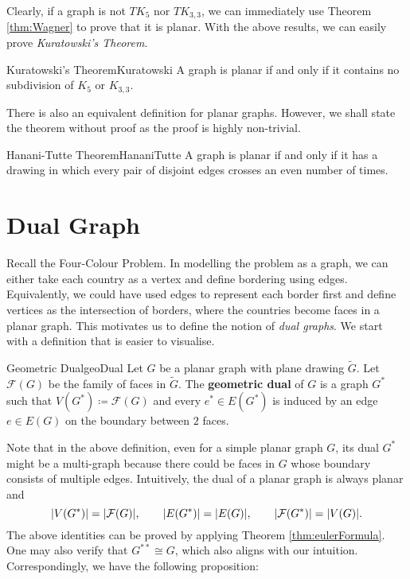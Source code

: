 \documentclass[math, code]{amznotes}
\theoremstyle{remark}
\begin{document}
Clearly, if a graph is not $TK_5$ nor $TK_{3, 3}$, we can immediately use Theorem \ref{thm:Wagner} to prove that it is planar. With the above results, we can easily prove \textit{Kuratowski's Theorem}.
\begin{thmbox}{Kuratowski's Theorem}{Kuratowski}
    A graph is planar if and only if it contains no subdivision of $K_5$ or $K_{3, 3}$.
\end{thmbox}
There is also an equivalent definition for planar graphs. However, we shall state the theorem without proof as the proof is highly non-trivial.
\begin{thmbox}{Hanani-Tutte Theorem}{HananiTutte}
    A graph is planar if and only if it has a drawing in which every pair of disjoint edges crosses an even number of times.
\end{thmbox}
\section{Dual Graph}
Recall the Four-Colour Problem. In modelling the problem as a graph, we can either take each country as a vertex and define bordering using edges. Equivalently, we could have used edges to represent each border first and define vertices as the intersection of borders, where the countries become faces in a planar graph. This motivates us to define the notion of \textit{dual graphs}. We start with a definition that is easier to visualise.
\begin{dfnbox}{Geometric Dual}{geoDual}
    Let $G$ be a planar graph with plane drawing $\tilde{G}$. Let $\mathcal{F}(G)$ be the family of faces in $\tilde{G}$. The {\color{red} \textbf{geometric dual}} of $G$ is a graph $G^*$ such that $V(G^*) \coloneqq \mathcal{F}(G)$ and every $e^* \in E(G^*)$ is induced by an edge $e \in E(G)$ on the boundary between $2$ faces.
\end{dfnbox}
Note that in the above definition, even for a simple planar graph $G$, its dual $G^*$ might be a multi-graph because there could be faces in $G$ whose boundary consists of multiple edges. Intuitively, the dual of a planar graph is always planar and 
\begin{equation*}
    {\left\lvert {V(G^*)} \right\rvert} = {\left\lvert {\mathcal{F}(G)} \right\rvert}, \qquad {\left\lvert {E(G^*)} \right\rvert} = {\left\lvert {E(G)} \right\rvert}, \qquad {\left\lvert {\mathcal{F}(G^*)} \right\rvert} = {\left\lvert {V(G)} \right\rvert}.
\end{equation*}
The above identities can be proved by applying Theorem \ref{thm:eulerFormula}. One may also verify that $G^{**} \cong G$, which also aligns with our intuition. Correspondingly, we have the following proposition:
\end{document}
